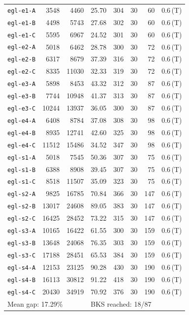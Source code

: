 \begin{longtable}{lrrrrrrl}
\texttt{egl-e1-A} & 3548 & 4460 & 25.70 & 304 & 30 & 60 & 0.6\,(T) \\
\texttt{egl-e1-B} & 4498 & 5743 & 27.68 & 302 & 30 & 60 & 0.6\,(T) \\
\texttt{egl-e1-C} & 5595 & 6967 & 24.52 & 301 & 30 & 60 & 0.6\,(T) \\
\texttt{egl-e2-A} & 5018 & 6462 & 28.78 & 300 & 30 & 72 & 0.6\,(T) \\
\texttt{egl-e2-B} & 6317 & 8679 & 37.39 & 316 & 30 & 72 & 0.6\,(T) \\
\texttt{egl-e2-C} & 8335 & 11030 & 32.33 & 319 & 30 & 72 & 0.6\,(T) \\
\texttt{egl-e3-A} & 5898 & 8453 & 43.32 & 312 & 30 & 87 & 0.6\,(T) \\
\texttt{egl-e3-B} & 7744 & 10948 & 41.37 & 313 & 30 & 87 & 0.6\,(T) \\
\texttt{egl-e3-C} & 10244 & 13937 & 36.05 & 300 & 30 & 87 & 0.6\,(T) \\
\texttt{egl-e4-A} & 6408 & 8784 & 37.08 & 308 & 30 & 98 & 0.6\,(T) \\
\texttt{egl-e4-B} & 8935 & 12741 & 42.60 & 325 & 30 & 98 & 0.6\,(T) \\
\texttt{egl-e4-C} & 11512 & 15486 & 34.52 & 347 & 30 & 98 & 0.6\,(T) \\
\texttt{egl-s1-A} & 5018 & 7545 & 50.36 & 307 & 30 & 75 & 0.6\,(T) \\
\texttt{egl-s1-B} & 6388 & 8908 & 39.45 & 307 & 30 & 75 & 0.6\,(T) \\
\texttt{egl-s1-C} & 8518 & 11507 & 35.09 & 323 & 30 & 75 & 0.6\,(T) \\
\texttt{egl-s2-A} & 9825 & 16785 & 70.84 & 366 & 30 & 147 & 0.6\,(T) \\
\texttt{egl-s2-B} & 13017 & 24608 & 89.05 & 383 & 30 & 147 & 0.6\,(T) \\
\texttt{egl-s2-C} & 16425 & 28452 & 73.22 & 315 & 30 & 147 & 0.6\,(T) \\
\texttt{egl-s3-A} & 10165 & 16422 & 61.55 & 300 & 30 & 159 & 0.6\,(T) \\
\texttt{egl-s3-B} & 13648 & 24068 & 76.35 & 303 & 30 & 159 & 0.6\,(T) \\
\texttt{egl-s3-C} & 17188 & 28451 & 65.53 & 384 & 30 & 159 & 0.6\,(T) \\
\texttt{egl-s4-A} & 12153 & 23125 & 90.28 & 430 & 30 & 190 & 0.6\,(T) \\
\texttt{egl-s4-B} & 16113 & 30812 & 91.22 & 418 & 30 & 190 & 0.6\,(T) \\
\texttt{egl-s4-C} & 20430 & 34919 & 70.92 & 376 & 30 & 190 & 0.6\,(T) \\
\midrule
\multicolumn{3}{l}{Mean gap: 17.29\%} & \multicolumn{5}{l}{BKS reached: 18/87} \\
\end{longtable}
\endgroup